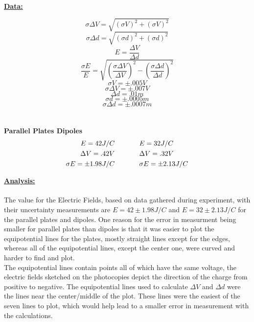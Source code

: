 \documentclass{report}
\newcommand\tab[1][1cm]{\hspace*{#1}}
\begin{document}
\begin{flushleft}
\newpage

{\Large \textbf{\underline{Data:}}}
\\
{\large
\begin{flushleft}

\[\sigma \Delta V = \sqrt{(\sigma V)^2 + (\sigma V)^2}\]
\[\sigma \Delta d = \sqrt{(\sigma d)^2 + (\sigma d)^2}\]
\[E = \frac{\Delta V}{\Delta d}\]
\[\frac{\sigma E}{E} = \sqrt{(\frac{\sigma \Delta V}{\Delta V})^2 - (\frac{\sigma \Delta d}{\Delta d})^2}\]
\[\sigma V = \pm .005V\]
\[\sigma \Delta V = \pm .007V\]
\[\Delta d = .01m\]
\[\sigma d = \pm .0005m\]
\[\sigma \Delta d = \pm .0007m\]
\\\hspace{.1in}\\
{\Large \textbf{\hspace{.8in}Parallel Plates \hspace{.3in} Dipoles}}
\begin{equation}
\begin{split}
E = 42J/C &\hspace{.5in} E = 32J/C
\\
\Delta V = .42V &\hspace{.5in} \Delta V = .32V
\\
\sigma E = \pm 1.98J/C  &\hspace{.5in} \sigma E = \pm 2.13J/C
\end{split}
\end{equation}
\end{flushleft}
}

\newpage

{\Large \textbf{\underline{Analysis:}}}
\\\hspace{.1in}\\
{\large
\tab The value for the Electric Fields, based on data gathered during experiment, with their uncertainty measurements are \(E = 42 \pm 1.98J/C\) and
\(E = 32 \pm 2.13J/C\) for the parallel plates and dipoles. One reason for the error in measurment being smaller for parallel plates than dipoles is that it was easier to plot the equipotential lines for the plates, mostly straight lines except for the edges, whereas all of the equipotential lines, except the center one, were curved and harder to find and plot.
\\
\tab The equipotential lines contain points all of which have the same voltage, the electric fields sketched on the photocopies depict the direction of the charge from positive to negative. The equipotential lines used to calculate \(\Delta V\) and \(\Delta d\) were the lines near the center/middle of the plot. These lines were the easiest of the seven lines to plot, which would help lead to a smaller error in measurement with the calculations.
}


\end{flushleft}
\end{document}
